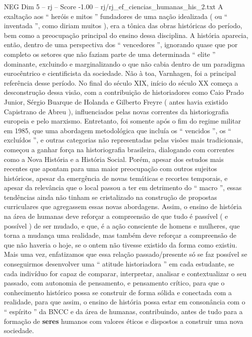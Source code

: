 \begin{textsample}{NEG Dim 5 – rj – Score -1.00 – rj/rj\_ef\_ciencias\_humanas\_his\_2.txt}
A exaltação aos “ heróis e mitos ” fundadores de uma nação idealizada ( ou “ inventada ”, como diriam muitos ), era a tônica das obras históricas do período, bem como a preocupação principal do ensino dessa disciplina.
A história aparecia, então, dentro de uma perspectiva dos “ vencedores ”, ignorando quase que por completo os setores que não faziam parte de uma determinada “ elite ” dominante, excluindo e marginalizando o que não cabia dentro de um paradigma eurocêntrico e cientificista da sociedade.
Não à toa, Varnhagen, foi a principal referência desse período.
No final do século XIX, início do século XX começa a desconstrução dessa visão, com a contribuição de historiadores como Caio Prado Junior, Sérgio Buarque de Holanda e Gilberto Freyre ( antes havia existido Capistrano de Abreu ), influenciados pelas novas correntes da historiografia europeia e pelo marxismo.
Entretanto, foi somente após o fim do regime militar em 1985, que uma abordagem metodológica que incluía os “ vencidos ”, os “ excluídos ”, e outras categorias não representadas pelas visões mais tradicionais, começou a ganhar força na historiografia brasileira, dialogando com correntes como a Nova História e a História Social.
Porém, apesar dos estudos mais recentes que apontam para uma maior preocupação com outros sujeitos históricos, apesar da emergência de novas temáticas e recortes temporais, e apesar da relevância que o local passou a ter em detrimento do “ macro ”, essas tendências ainda não tinham se cristalizado na construção de propostas curriculares que agregassem essas novas abordagens.
Assim, o ensino de história na área de humanas deve reforçar a compreensão de que tudo é passível ( e possível ) de ser mudado, e que, é a ação consciente de homens e mulheres, que torna a mudança uma realidade, mas também deve reforçar a compreensão de que não haveria o hoje, se o ontem não tivesse existido da forma como existiu.
Mais uma vez, enfatizamos que essa relação passado/presente só se faz possível se conseguirmos desenvolver uma “ atitude historiadora ” em cada estudante, se cada indivíduo for capaz de comparar, interpretar, analisar e contextualizar o seu passado, com autonomia de pensamento, e pensamento crítico, para que o conhecimento histórico possa se construir de forma sólida e conectada com a realidade, para que assim, o ensino de história possa estar em consonância com o “ espírito ” da BNCC e da área de humanas, contribuindo, antes de tudo para a formação de \textbf{seres} humanos com valores éticos e dispostos a construir uma nova sociedade.

\end{textsample}
